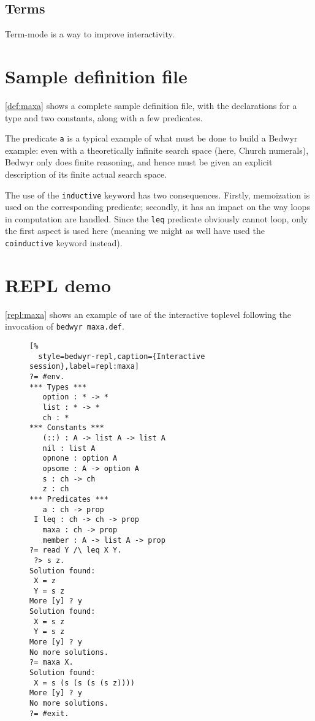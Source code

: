 \documentclass[a4paper,twocolumn]{article}
\begin{document}
\subsection{Terms}
\label{sec:terms}

Term-mode is a way to improve interactivity.

\section{Sample definition file}

\autoref{def:maxa} shows a complete sample definition file,
with the declarations for a type and two constants, along with a few predicates.

\begin{figure}[t]
  
\end{figure}

The predicate \lstinline+a+ is a typical example of what must be done to build
a Bedwyr example: even with a theoretically infinite search space
(here, Church numerals), Bedwyr only does finite reasoning, and hence must be
given an explicit description of its finite actual search space.

The use of the \lstinline+inductive+ keyword has two consequences.
Firstly, memoization is used on the corresponding predicate;
secondly, it has an impact on the way loops in computation are handled.
Since the \lstinline+leq+ predicate obviously cannot loop,
only the first aspect is used here (meaning we might as well have used the
\lstinline+coinductive+ keyword instead).

\section{REPL demo}

\autoref{repl:maxa} shows an example of use of the interactive toplevel
following the invocation of \verb+bedwyr maxa.def+.

\begin{figure}[t]\begin{lstlisting}[%
  style=bedwyr-repl,caption={Interactive session},label=repl:maxa]
?= #env.
*** Types ***
   option : * -> *
   list : * -> *
   ch : *
*** Constants ***
   (::) : A -> list A -> list A
   nil : list A
   opnone : option A
   opsome : A -> option A
   s : ch -> ch
   z : ch
*** Predicates ***
   a : ch -> prop
 I leq : ch -> ch -> prop
   maxa : ch -> prop
   member : A -> list A -> prop
?= read Y /\ leq X Y.
 ?> s z.
Solution found:
 X = z
 Y = s z
More [y] ? y
Solution found:
 X = s z
 Y = s z
More [y] ? y
No more solutions.
?= maxa X.
Solution found:
 X = s (s (s (s (s z))))
More [y] ? y
No more solutions.
?= #exit.
\end{lstlisting}\end{figure}
\end{document}
